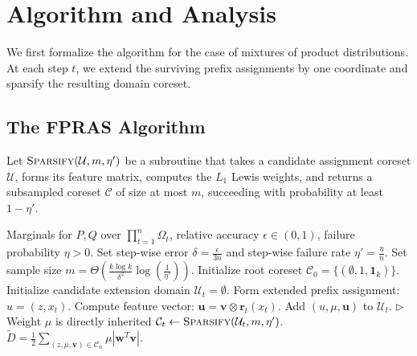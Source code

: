 \documentclass{article}
\begin{document}
\section{Algorithm and Analysis}

We first formalize the algorithm for the case of mixtures of product distributions. At each step $t$, we extend the surviving prefix assignments by one coordinate and sparsify the resulting domain coreset.

\subsection{The FPRAS Algorithm}

Let $\textsc{Sparsify}(\mathcal{U}, m, \eta')$ be a subroutine that takes a candidate assignment coreset $\mathcal{U}$, forms its feature matrix, computes the $L_1$ Lewis weights, and returns a subsampled coreset $\mathcal{C}$ of size at most $m$, succeeding with probability at least $1 - \eta'$.

\begin{algorithm}[H]
\caption{FPRAS for Mixture TV via Assignment Coresets}
\label{alg:fptas}
\begin{algorithmic}[1]
\REQUIRE Marginals for $P, Q$ over $\prod_{t=1}^n \Omega_t$, relative accuracy $\epsilon \in (0, 1)$, failure probability $\eta > 0$.
\STATE Set step-wise error $\delta = \frac{\epsilon}{3n}$ and step-wise failure rate $\eta' = \frac{\eta}{n}$.
\STATE Set sample size $m = \Theta \left( \frac{k \log k}{\delta^2} \log\left(\frac{1}{\eta'}\right) \right)$.
\STATE Initialize root coreset $\mathcal{C}_0 = \{ (\emptyset, 1, \mathbf{1}_{k}) \}$.
    \STATE Initialize candidate extension domain $\mathcal{U}_t = \emptyset$.
            \STATE Form extended prefix assignment: $u = (z, x_t)$.
            \STATE Compute feature vector: $\mathbf{u} = \mathbf{v} \otimes \mathbf{r}_t(x_t)$.
            \STATE Add $(u, \mu, \mathbf{u})$ to $\mathcal{U}_t$.  \hfill $\triangleright$ Weight $\mu$ is directly inherited
        \ENDFOR
    \ENDFOR
    \STATE $\mathcal{C}_t \leftarrow \textsc{Sparsify}(\mathcal{U}_t, m, \eta')$.
\ENDFOR
\RETURN $\tilde{D} = \frac{1}{2} \sum_{(z, \mu, \mathbf{v}) \in \mathcal{C}_n} \mu \left| \mathbf{w}^T \mathbf{v} \right|$.
\end{algorithmic}
\end{algorithm}
\end{document}
